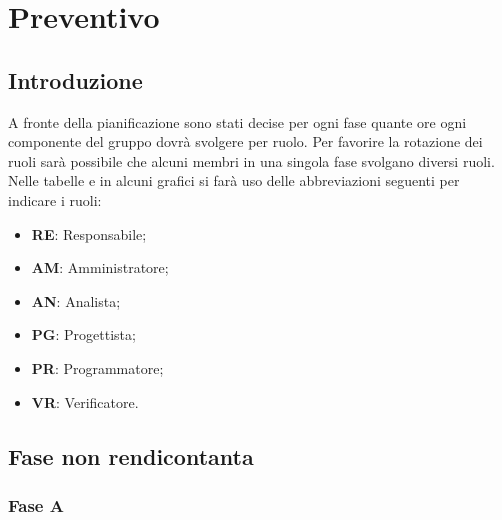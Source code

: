 \section{Preventivo} 
	\subsection{Introduzione}
		A fronte della pianificazione sono stati decise per ogni fase quante ore ogni componente del gruppo dovrà svolgere per ruolo.
		Per favorire la rotazione dei ruoli sarà possibile che alcuni membri in una singola fase svolgano diversi ruoli. \\
		Nelle tabelle e in alcuni grafici si farà uso delle abbreviazioni seguenti per indicare i ruoli:
		\begin{itemize} 
			\item \textbf{RE}: Responsabile;
			\item \textbf{AM}: Amministratore;
			\item \textbf{AN}: Analista;
			\item \textbf{PG}: Progettista;
			\item \textbf{PR}: Programmatore;
			\item \textbf{VR}: Verificatore.
		\end{itemize}
		
	\newpage	
	\subsection{Fase non rendicontanta}
		
		\subsubsection{Fase A}
		
